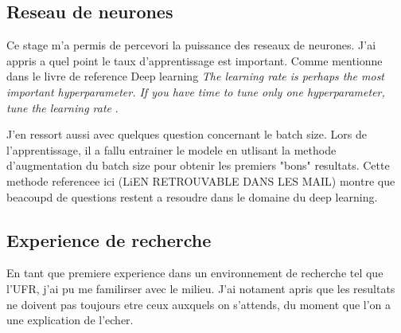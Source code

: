 \subsection{Reseau de neurones}
Ce stage m'a permis de percevori la puissance des reseaux de neurones. J'ai appris a quel point le taux d'apprentissage est important. Comme mentionne dans le livre de reference Deep learning \textit{The learning rate is perhaps the most important hyperparameter. If you have time to tune only one hyperparameter, tune the learning rate} \parencite[417]{Reference5}. 

J'en ressort aussi avec quelques question concernant le batch size. Lors de l'apprentissage, il a fallu entrainer le modele en utlisant la methode d'augmentation du batch size pour obtenir les premiers "bons" resultats. Cette methode referencee ici (LiEN RETROUVABLE DANS LES MAIL) montre que beacoupd de questions restent a resoudre dans le domaine du deep learning.

\subsection{Experience de recherche}
En tant que premiere experience dans un environnement de recherche tel que l'UFR, j'ai pu me familirser avec le milieu. J'ai notament apris que les resultats ne doivent pas toujours etre ceux auxquels on s'attends, du moment que l'on a une explication de l'echer.

